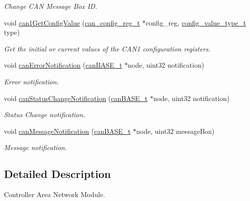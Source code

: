 \begin{DoxyCompactItemize}
\begin{DoxyCompactList}\small\item\em Change C\+AN Message Box ID. \end{DoxyCompactList}\item 
void \mbox{\hyperlink{group__CAN_ga7a14fa4c6067295ee692dbe3e5edff8d}{can1\+Get\+Config\+Value}} (\mbox{\hyperlink{structcan__config__reg}{can\+\_\+config\+\_\+reg\+\_\+t}} $\ast$config\+\_\+reg, \mbox{\hyperlink{sys__common_8h_a9daf9a5992391b058477d28d107ee5e2}{config\+\_\+value\+\_\+type\+\_\+t}} type)
\begin{DoxyCompactList}\small\item\em Get the initial or current values of the C\+A\+N1 configuration registers. \end{DoxyCompactList}\item 
void \mbox{\hyperlink{group__CAN_gab54b99b32b9402b55b845029f9118b77}{can\+Error\+Notification}} (\mbox{\hyperlink{reg__can_8h_a54ace0879c28a425474845a63d662c05}{can\+B\+A\+S\+E\+\_\+t}} $\ast$node, uint32 notification)
\begin{DoxyCompactList}\small\item\em Error notification. \end{DoxyCompactList}\item 
void \mbox{\hyperlink{group__CAN_gafb381df2cdfb4e84f43df0226a757002}{can\+Status\+Change\+Notification}} (\mbox{\hyperlink{reg__can_8h_a54ace0879c28a425474845a63d662c05}{can\+B\+A\+S\+E\+\_\+t}} $\ast$node, uint32 notification)
\begin{DoxyCompactList}\small\item\em Status Change notification. \end{DoxyCompactList}\item 
void \mbox{\hyperlink{group__CAN_gacac999ab73fd61efe4dfc10883ea287c}{can\+Message\+Notification}} (\mbox{\hyperlink{reg__can_8h_a54ace0879c28a425474845a63d662c05}{can\+B\+A\+S\+E\+\_\+t}} $\ast$node, uint32 message\+Box)
\begin{DoxyCompactList}\small\item\em Message notification. \end{DoxyCompactList}\end{DoxyCompactItemize}


\subsection{Detailed Description}
Controller Area Network Module. 

